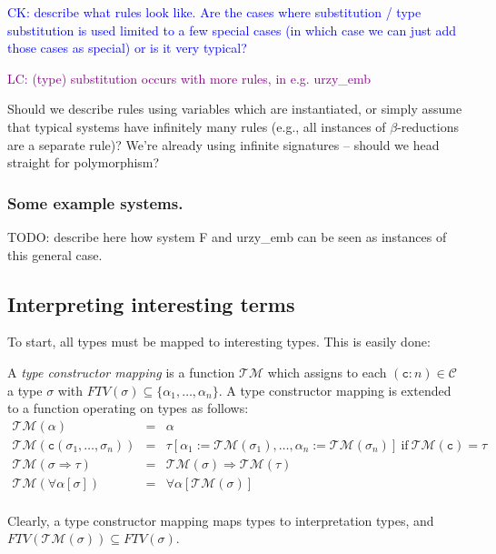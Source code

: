 \documentclass[runningheads,a4paper]{llncs}
\newcommand{\TypeConstructors}{\mathcal{C}}
\newcommand{\Typemap}{\mathcal{T\!M}}
\newcommand{\quant}[2]{\forall #1[#2]}
\newcommand{\arrtype}{\Rightarrow}
\newcommand{\FTV}{\mathit{FTV}}
\newcommand{\con}{\mathtt{c}}
\newcommand{\CK}[1]{\textcolor{blue}{CK: #1}}
\newcommand{\LC}[1]{\textcolor{purple}{LC: #1}}
\begin{document}
\CK{describe what rules look like.  Are the cases where substitution
/ type substitution is used limited to a few special cases (in which
case we can just add those cases as special) or is it very typical?}

\LC{(type) substitution occurs with more rules, in e.g. urzy\_emb}

Should we describe rules using variables which are instantiated, or
simply assume that typical systems have infinitely many rules (e.g.,
all instances of $\beta$-reductions are a separate rule)? We're
already using infinite signatures -- should we head straight for
polymorphism?

\subsubsection{Some example systems.}

TODO: describe here how system F and urzy\_emb can be seen as instances
of this general case.

\subsection{Interpreting interesting terms}

To start, all types must be mapped to interesting types.  This is
easily done:

\begin{definition}
A \emph{type constructor mapping} is a function $\Typemap$ which assigns
to each $(\con:n) \in \TypeConstructors$ a type $\sigma$ with
$\FTV(\sigma) \subseteq \{ \alpha_1,\dots,\alpha_n \}$.  A type
constructor mapping is extended to a function operating on types as
follows:
\[
\begin{array}{rcl}
\Typemap(\alpha) & = & \alpha \\
\Typemap(\con(\sigma_1,\dots,\sigma_n)) & = &
  \tau[\alpha_1:=\Typemap(\sigma_1),\dots,\alpha_n:=\Typemap(\sigma_n)]\ 
  \text{if}\ \Typemap(\con) = \tau \\
\Typemap(\sigma \arrtype \tau) & = & \Typemap(\sigma) \arrtype
  \Typemap(\tau) \\
\Typemap(\quant{\alpha}{\sigma}) & = & \quant{\alpha}{\Typemap(\sigma)} \\
\end{array}
\]
\end{definition}

Clearly, a type constructor mapping maps types to interpretation types,
and $\FTV(\Typemap(\sigma)) \subseteq \FTV(\sigma)$.
\end{document}
